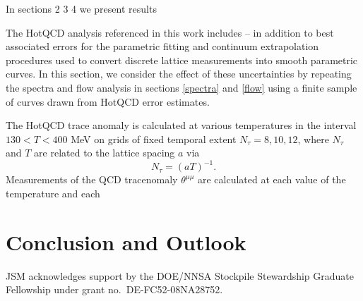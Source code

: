 \documentclass[aps,prc,reprint,amsmath,nofootinbib,superscriptaddress]{revtex4-1}
\begin{document}
In sections 2 3 4 we present results 

The HotQCD analysis referenced in this work includes -- in addition to best associated errors for the parametric fitting and continuum extrapolation procedures used to convert discrete lattice measurements into smooth parametric curves. In this 
section, we consider the effect of these uncertainties by repeating the spectra and flow analysis in sections \ref{spectra} and \ref{flow} using a finite sample of curves drawn
from HotQCD error estimates.

The HotQCD trace anomaly is calculated at various temperatures in the interval $130 < T < 400$ MeV on grids of fixed temporal extent $N_\tau = 8,10,12$, where $N_\tau$ and $T$ are related to the lattice spacing $a$ via
\begin{equation}
 N_\tau = (aT)^{-1}.
\end{equation}
Measurements of the QCD tracenomaly $\theta^{\mu\mu}$ are calculated at each value of the temperature and each




\section{Conclusion and Outlook}

\begin{acknowledgments}
 JSM acknowledges support by the DOE/NNSA Stockpile Stewardship Graduate Fellowship under grant no.~DE-FC52-08NA28752.
\end{acknowledgments}


\end{document}

